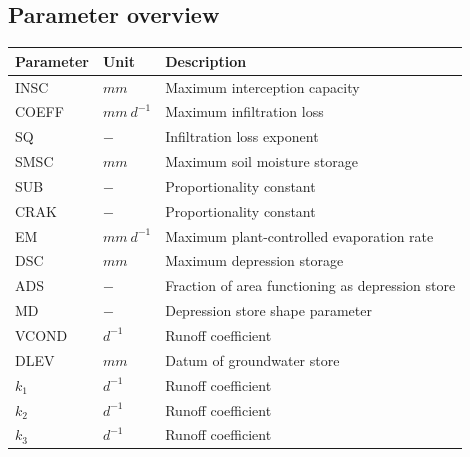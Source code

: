 \subsection{Parameter overview}
\begin{table}[htbp]
  \centering
    \begin{tabular}{lll}
    \toprule
    Parameter & Unit  & Description \\
    \midrule
    INSC  & $mm$  & Maximum interception capacity \\
    COEFF & $mm~d^{-1}$ & Maximum infiltration loss \\
    SQ    & $-$   & Infiltration loss exponent \\
    SMSC  & $mm$  & Maximum soil moisture storage \\
    SUB   & $-$   & Proportionality constant \\
    CRAK  & $-$   & Proportionality constant \\
    EM    & $mm~d^{-1}$ & Maximum plant-controlled evaporation rate \\
    DSC   & $mm$  & Maximum depression storage \\
    ADS   & $-$   & Fraction of area functioning as depression store \\
    MD    & $-$   & Depression store shape parameter \\
    VCOND & $d^{-1}$ & Runoff coefficient \\
    DLEV  & $mm$  & Datum of groundwater store \\
    $k_1$ & $d^{-1}$ & Runoff coefficient \\
    $k_2$ & $d^{-1}$ & Runoff coefficient \\
    $k_3$ & $d^{-1}$ & Runoff coefficient \\
    \bottomrule
    \end{tabular}%
  \label{tab:addlabel}%
\end{table}%
